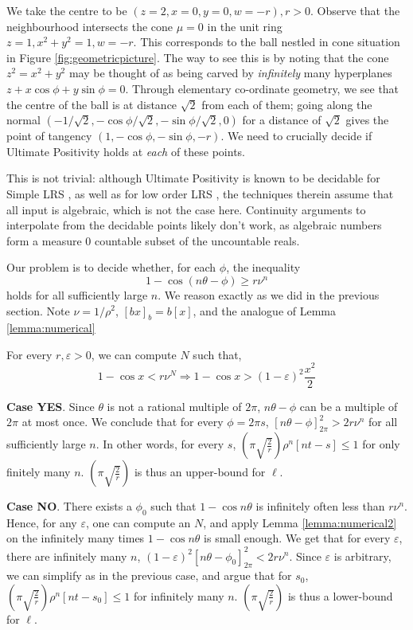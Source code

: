 We take the centre to be $(z = 2, x = 0, y= 0, w = -r), r > 0$. Observe that the neighbourhood intersects the cone $\mu = 0$ in the unit ring $z= 1, x^2 + y^2 = 1, w = -r$. This corresponds to the ball nestled in cone situation in Figure \ref{fig:geometricpicture}. The way to see this is by noting that the cone $z^2 = x^2 + y^2$ may be thought of as being carved by \textit{infinitely} many hyperplanes $z + x\cos \phi + y\sin \phi = 0$. Through elementary co-ordinate geometry, we see that the centre of the ball is at distance $\sqrt{2}$ from each of them; going along the normal $(-1/\sqrt{2}, -\cos\phi/\sqrt{2}, -\sin\phi/\sqrt{2}, 0)$ for a distance of $\sqrt{2}$ gives the point of tangency $(1, -\cos\phi, -\sin\phi, -r)$. We need to crucially decide if Ultimate Positivity holds at \textit{each} of these points. 

This is not trivial: although Ultimate Positivity is known to be decidable for Simple LRS \cite{ouaknine2014ultimate}, as well as for low order LRS \cite{joeljames3}, the techniques therein assume that all input is algebraic, which is not the case here. Continuity arguments to interpolate from the decidable points likely don't work, as algebraic numbers form a measure $0$ countable subset of the uncountable reals.

Our problem is to decide whether, for each $\phi$, the inequality
\begin{equation}
\label{eq:ring}
1 -\cos(n\theta-\phi) \ge r\nu^n
\end{equation}
holds for all sufficiently large $n$. We reason exactly as we did in the previous section. Note $\nu = 1/\rho^2$, $[bx]_b = b[x]$, and the analogue of Lemma \ref{lemma:numerical}
\begin{lemma}
\label{lemma:numerical2}
For every $r, \varepsilon > 0$, we can compute $N$ such that,
$$1 - \cos x < r\nu^N  \Rightarrow 1- \cos x > (1 - \varepsilon)^2\frac{x^2}{2}$$
\end{lemma}

\textbf{Case YES}.
Since $\theta$ is not a rational multiple of $2\pi$, $n\theta - \phi$ can be a multiple of $2\pi$ at most once. We conclude that for every $\phi = 2\pi s$, $[n\theta-\phi]_{2\pi}^2 > 2r\nu^n$ for all sufficiently large $n$. In other words, for every $s$, $\left(\pi\sqrt{\frac{2}{r}}\right)\rho^n[nt - s] \le 1$ for only finitely many $n$. $\left(\pi\sqrt{\frac{2}{r}}\right)$ is thus an upper-bound for $\ell$.

\textbf{Case NO}.
There exists a $\phi_0$ such that $1 - \cos n\theta$ is infinitely often less than $r\nu^n$. Hence, for any $\varepsilon$, one can compute an $N$, and apply Lemma \ref{lemma:numerical2} on the infinitely many times $1 - \cos n\theta$ is small enough. We get that for every $\varepsilon$, there are infinitely many $n$, $(1-\varepsilon)^2[n\theta-\phi_0]_{2\pi}^2 < 2r\nu^n$. Since $\varepsilon$ is arbitrary, we can simplify as in the previous case, and argue that for $s_0$, $\left(\pi\sqrt{\frac{2}{r}}\right)\rho^n[nt - s_0] \le 1$ for infinitely many $n$. $\left(\pi\sqrt{\frac{2}{r}}\right)$ is thus a lower-bound for $\ell$.

